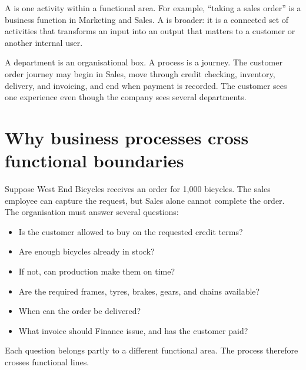 A  is one activity within a functional area. For example, ``taking a sales order'' is a business function in Marketing and Sales. A  is broader: it is a connected set of activities that transforms an input into an output that matters to a customer or another internal user.

\begin{intuition}
A department is an organisational box. A process is a journey. The customer order journey may begin in Sales, move through credit checking, inventory, delivery, and invoicing, and end when payment is recorded. The customer sees one experience even though the company sees several departments.
\end{intuition}

\section{Why business processes cross functional boundaries}

Suppose West End Bicycles receives an order for 1,000 bicycles. The sales employee can capture the request, but Sales alone cannot complete the order. The organisation must answer several questions:

\begin{itemize}
  \item Is the customer allowed to buy on the requested credit terms?
  \item Are enough bicycles already in stock?
  \item If not, can production make them on time?
  \item Are the required frames, tyres, brakes, gears, and chains available?
  \item When can the order be delivered?
  \item What invoice should Finance issue, and has the customer paid?
\end{itemize}

Each question belongs partly to a different functional area. The process therefore crosses functional lines.

